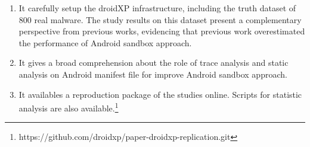 \begin{enumerate}[1.]
\item It carefully setup the droidXP infrastructure, including the truth dataset of 800 real malware. The study results on this dataset present a complementary perspective from previous works, evidencing that previous work overestimated the performance of Android sandbox approach.
\item It gives a broad comprehension about the role of trace analysis and static analysis on Android manifest file for improve Android sandbox approach.
\item It availables a reproduction package of the studies online. Scripts for statistic analysis are also available.\footnote{https://github.com/droidxp/paper-droidxp-replication.git}
\end{enumerate}





